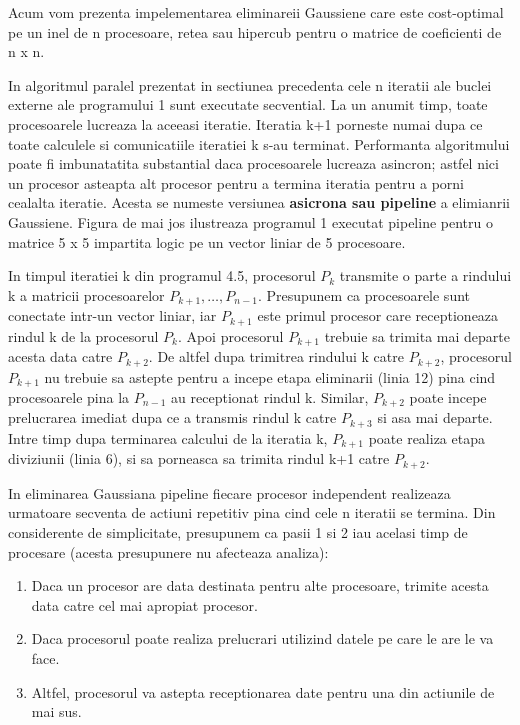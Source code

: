 \label{implementare}
\hspace{5mm}Acum vom prezenta impelementarea eliminareii Gaussiene care este
cost-optimal pe un inel de n procesoare, retea sau hipercub pentru o matrice
de coeficienti de n x n.

In algoritmul paralel prezentat in sectiunea precedenta cele n iteratii ale
buclei externe ale programului 1 sunt executate secvential. La un anumit
timp, toate procesoarele lucreaza la aceeasi iteratie. Iteratia k+1 porneste
numai dupa ce toate calculele si comunicatiile iteratiei k s-au terminat.
Performanta algoritmului poate fi imbunatatita substantial daca procesoarele
lucreaza asincron; astfel nici un procesor asteapta alt procesor pentru a
termina iteratia pentru a porni cealalta iteratie. Acesta se numeste
versiunea {\bf asicrona sau pipeline} a elimianrii Gaussiene. Figura de mai
jos ilustreaza programul 1 executat pipeline pentru o matrice 5 x 5
impartita logic pe un vector liniar de 5 procesoare.

In timpul iteratiei k din programul 4.5, procesorul $P_k$ transmite o parte
a rindului k a matricii procesoarelor $P_{k+1},\ldots,P_{n-1}$. Presupunem
ca procesoarele sunt conectate intr-un vector liniar, iar $P_{k+1}$ este
primul procesor care receptioneaza rindul k de la procesorul $P_k$. Apoi
procesorul $P_{k+1}$ trebuie sa trimita mai departe acesta data catre
$P_{k+2}$. De altfel dupa trimitrea rindului k catre $P_{k+2}$, procesorul
$P_{k+1}$ nu trebuie sa astepte pentru a incepe etapa eliminarii (linia 12)
pina cind procesoarele pina la $P_{n-1}$ au receptionat rindul k. Similar,
$P_{k+2}$ poate incepe prelucrarea imediat dupa ce a transmis rindul k catre
$P_{k+3}$ si asa mai departe. Intre timp dupa terminarea calcului de la
iteratia k, $P_{k+1}$ poate realiza etapa diviziunii (linia 6), si sa
porneasca sa trimita rindul k+1 catre $P_{k+2}$.

In eliminarea Gaussiana pipeline fiecare procesor independent realizeaza
urmatoare secventa de actiuni repetitiv pina cind cele n iteratii se
termina. Din considerente de simplicitate, presupunem ca pasii 1 si 2 iau
acelasi timp de procesare (acesta presupunere nu afecteaza analiza):

\begin{enumerate}
\item Daca un procesor are data destinata pentru alte procesoare, trimite
acesta data catre cel mai apropiat procesor.
\item Daca procesorul poate realiza prelucrari utilizind datele pe care le
are le va face.
\item Altfel, procesorul va astepta receptionarea date pentru una din
actiunile de mai sus.
\end{enumerate}

